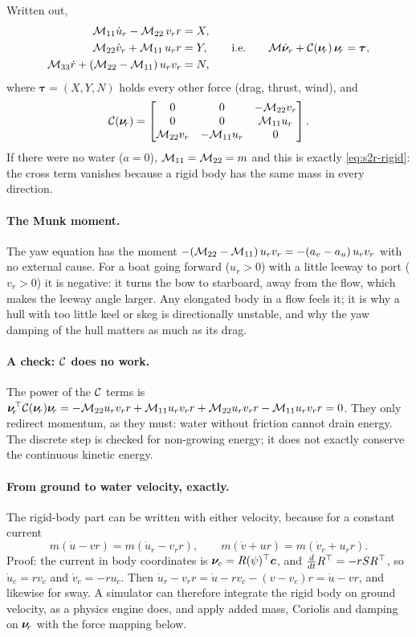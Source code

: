 Written out,
\begin{equation}
\begin{aligned}
  \mathcal{M}_{11}\dot u_r - \mathcal{M}_{22}\, v_r r &= X,\\
  \mathcal{M}_{22}\dot v_r + \mathcal{M}_{11}\, u_r r &= Y,\\
  \mathcal{M}_{33}\dot r + (\mathcal{M}_{22} - \mathcal{M}_{11})\,u_r v_r &= N,
\end{aligned}
\qquad\text{i.e.}\qquad
\mathcal{M}\dot{\bm{\nu}}_r + \mathcal{C}(\bm{\nu}_{\!r})\,\bm{\nu}_{\!r} = \bm\tau,
\label{eq:s2r-fossen}
\end{equation}
where $\bm\tau = (X, Y, N)$ holds every other force (drag, thrust, wind), and
\[
  \mathcal{C}(\bm{\nu}_{\!r}) = \begin{bmatrix}
    0 & 0 & -\mathcal{M}_{22} v_r\\
    0 & 0 & \mathcal{M}_{11} u_r\\
    \mathcal{M}_{22} v_r & -\mathcal{M}_{11} u_r & 0
  \end{bmatrix}.
\]
If there were no water ($a = 0$), $\mathcal{M}_{11} = \mathcal{M}_{22} = m$ and this is exactly
\eqref{eq:s2r-rigid}: the cross term vanishes because a rigid body has the same
mass in every direction.

\paragraph{The Munk moment.} The yaw equation has the moment
$-(\mathcal{M}_{22} - \mathcal{M}_{11})\,u_r v_r = -(a_v - a_u)\,u_r v_r$ with no external cause.
For a boat going forward ($u_r > 0$) with a little leeway to port ($v_r > 0$) it is
negative: it turns the bow to starboard, away from the flow, which makes the leeway
angle larger. Any elongated body in a flow feels it; it is why a hull with too
little keel or skeg is directionally unstable, and why the yaw damping of the hull
matters as much as its drag.

\paragraph{A check: $\mathcal{C}$ does no work.} The power of the $\mathcal{C}$ terms is
$\bm{\nu}_{\!r}^\top\mathcal{C}(\bm{\nu}_{\!r})\bm{\nu}_{\!r}
= -\mathcal{M}_{22}u_r v_r r + \mathcal{M}_{11} u_r v_r r + \mathcal{M}_{22} u_r v_r r - \mathcal{M}_{11} u_r v_r r = 0$.
They only redirect momentum, as they must: water without friction cannot drain
energy. The discrete step is checked for non-growing energy; it does not exactly
conserve the continuous kinetic energy.

\paragraph{From ground to water velocity, exactly.} The rigid-body part can be
written with either velocity, because for a constant current
\[
  m(\dot u - v r) = m(\dot u_r - v_r r),\qquad m(\dot v + u r) = m(\dot v_r + u_r r).
\]
Proof: the current in body coordinates is $\bm{\nu}_c = R(\psi)^\top\bm c$, and
$\tfrac{d}{dt}R^\top = -r SR^\top$, so $\dot u_c = r v_c$ and
$\dot v_c = -r u_c$. Then
$\dot u_r - v_r r = \dot u - r v_c - (v - v_c)r = \dot u - v r$, and likewise for
sway. A simulator can therefore integrate the rigid body on ground velocity, as a
physics engine does, and apply added mass, Coriolis and damping on $\bm{\nu}_{\!r}$
with the force mapping below.

